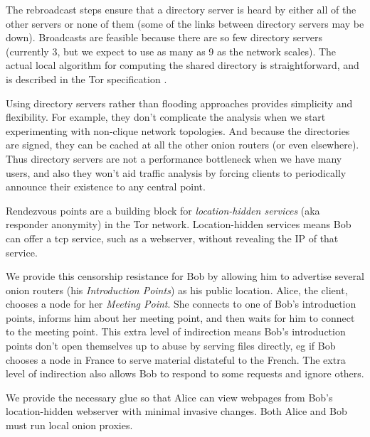 \documentclass[times,10pt,twocolumn]{article}
\begin{document}
The rebroadcast steps ensure that a directory server is heard by either
all of the other servers or none of them (some of the links between
directory servers may be down). Broadcasts are feasible because there
are so few directory servers (currently 3, but we expect to use as many
as 9 as the network scales). The actual local algorithm for computing
the shared directory is straightforward, and is described in the Tor
specification \cite{tor-spec}.

Using directory servers rather than flooding approaches provides
simplicity and flexibility. For example, they don't complicate
the analysis when we start experimenting with non-clique network
topologies. And because the directories are signed, they can be cached at
all the other onion routers (or even elsewhere). Thus directory servers
are not a performance bottleneck when we have many users, and also they
won't aid traffic analysis by forcing clients to periodically announce
their existence to any central point.

\label{sec:rendezvous}

Rendezvous points are a building block for \emph{location-hidden services}
(aka responder anonymity) in the Tor network. Location-hidden
services means Bob can offer a tcp service, such as a webserver,
without revealing the IP of that service.

We provide this censorship resistance for Bob by allowing him to
advertise several onion routers (his \emph{Introduction Points}) as his
public location. Alice, the client, chooses a node for her \emph{Meeting
Point}. She connects to one of Bob's introduction points, informs him
about her meeting point, and then waits for him to connect to the meeting
point. This extra level of indirection means Bob's introduction points
don't open themselves up to abuse by serving files directly, eg if Bob
chooses a node in France to serve material distateful to the French. The
extra level of indirection also allows Bob to respond to some requests
and ignore others.

We provide the necessary glue so that Alice can view webpages from Bob's
location-hidden webserver with minimal invasive changes. Both Alice and
Bob must run local onion proxies.
\end{document}
